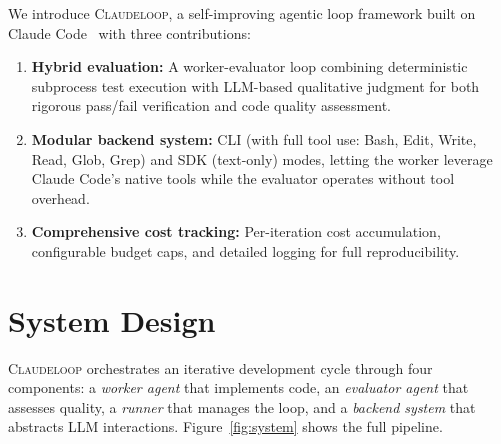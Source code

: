 \documentclass{article}
\begin{document}
We introduce \textsc{Claudeloop}, a self-improving agentic loop framework built on Claude Code~\cite{anthropic2025claude} with three contributions:
\begin{enumerate}
    \item \textbf{Hybrid evaluation:} A worker-evaluator loop combining deterministic subprocess test execution with LLM-based qualitative judgment for both rigorous pass/fail verification and code quality assessment.
    \item \textbf{Modular backend system:} CLI (with full tool use: Bash, Edit, Write, Read, Glob, Grep) and SDK (text-only) modes, letting the worker leverage Claude Code's native tools while the evaluator operates without tool overhead.
    \item \textbf{Comprehensive cost tracking:} Per-iteration cost accumulation, configurable budget caps, and detailed logging for full reproducibility.
\end{enumerate}

\section{System Design}

\textsc{Claudeloop} orchestrates an iterative development cycle through four components: a \emph{worker agent} that implements code, an \emph{evaluator agent} that assesses quality, a \emph{runner} that manages the loop, and a \emph{backend system} that abstracts LLM interactions. Figure~\ref{fig:system} shows the full pipeline.
\end{document}
